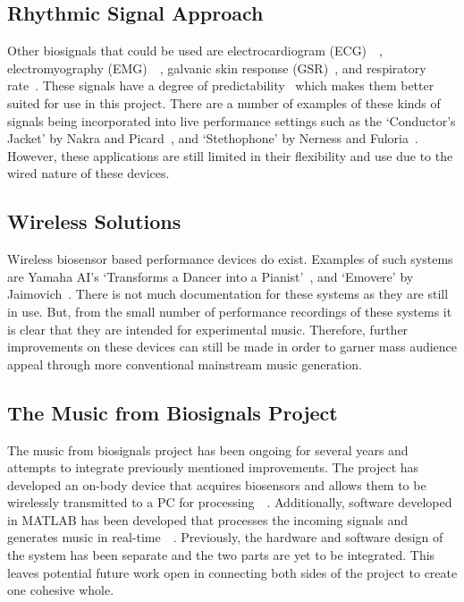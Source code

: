 \subsection{Rhythmic Signal Approach}
Other biosignals that could be used are electrocardiogram (ECG)~\cite{Afonso:1999}~\cite{Pan:1985},
electromyography (EMG)~\cite{Tanaka:2002}~\cite{Young:2013}, galvanic skin response (GSR)~\cite{Kurniawan:2013}, and respiratory rate~\cite{Carlos:2011}.
These signals have a degree of predictability~\cite{Tahiroğlu:2008} which makes them better suited for use in this project.
There are a number of examples of these kinds of signals being incorporated into live performance settings such as
the `Conductor's Jacket' by Nakra and Picard~\cite{Nakra:1998}, and `Stethophone' by Nerness and Fuloria~\cite{Nerness:2019}.
However, these applications are still limited in their flexibility and use due to the wired nature of these devices.

\subsection{Wireless Solutions}
Wireless biosensor based performance devices do exist.
Examples of such systems are Yamaha AI's `Transforms a Dancer into a Pianist'~\cite{Yamaha:2018}, and `Emovere' by Jaimovich~\cite{Jaimovich:2016}.
There is not much documentation for these systems as they are still in use.
But, from the small number of performance recordings of these systems it is clear that they are intended for experimental music.
Therefore, further improvements on these devices can still be made in order to garner mass audience appeal through more conventional mainstream music generation.

\subsection{The Music from Biosignals Project}
The music from biosignals project has been ongoing for several years and attempts to integrate previously mentioned improvements.
The project has developed an on-body device that acquires biosensors and allows them to be wirelessly transmitted to a PC for processing~\cite{Pierro:2019}~\cite{Tran:2022}.
Additionally, software developed in MATLAB has been developed that processes the incoming signals and generates music in real-time~\cite{Chen:2016}~\cite{Nicholls:2019}.
Previously, the hardware and software design of the system has been separate and the two parts are yet to be integrated.
This leaves potential future work open in connecting both sides of the project to create one cohesive whole.

